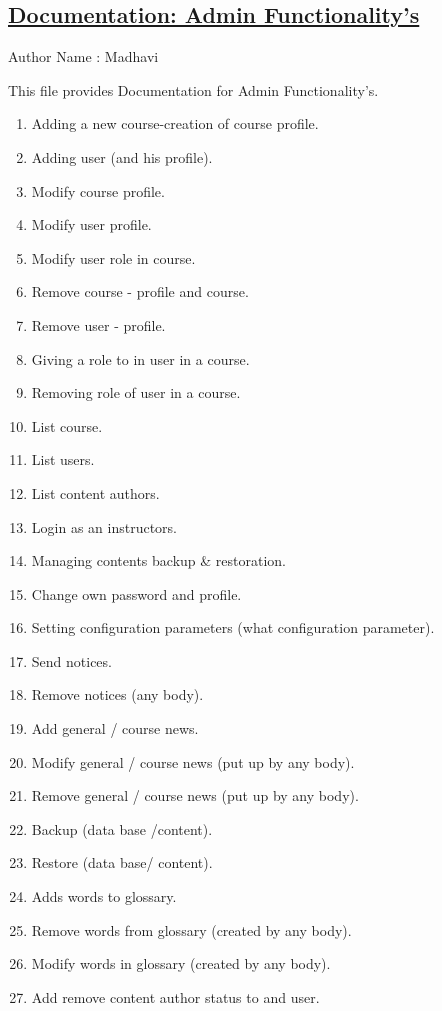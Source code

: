 \documentclass{article}
\begin{document}
\begin{center}
\section*{\underline{Documentation: Admin Functionality's}}
      Author Name : Madhavi 
\end{center}
This file provides Documentation for Admin Functionality's.
\begin{enumerate}
\item Adding a new course-creation of course profile.
\item Adding user  (and his profile).
\item Modify course profile.
\item Modify user profile.
\item Modify user role in course.
\item Remove course - profile and course.
\item Remove user - profile.
\item Giving a role to in user in a course.
\item Removing role of user in a course.
\item List course.
\item List users.
\item List content authors.
\item Login as an instructors.
\item Managing contents backup \& restoration.                                  
\item Change own password and profile.
\item Setting configuration parameters (what configuration parameter).
\item Send notices.
\item Remove notices (any  body).
\item Add general / course news.
\item Modify general / course news (put up by any body).
\item Remove general / course news  (put up by any body).
\item Backup (data base /content).
\item Restore (data base/ content).
\item Adds words to glossary.
\item Remove words from glossary (created by any body).
\item Modify words in glossary (created by any body).
\item Add remove content author status to and user.

\end{enumerate}
\end{document}
